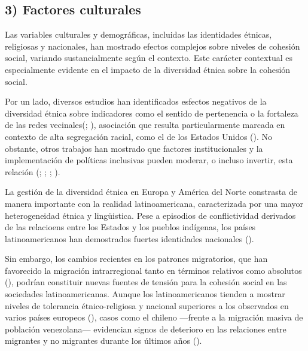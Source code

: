 \documentclass[
  letterpaper,
  DIV=11,
  numbers=noendperiod]{scrartcl}
\begin{document}
\subsection{3) Factores culturales}\label{factores-culturales}

Las variables culturales y demográficas, incluidas las identidades
étnicas, religiosas y nacionales, han mostrado efectos complejos sobre
niveles de cohesión social, variando sustancialmente según el contexto.
Este carácter contextual es especialmente evidente en el impacto de la
diversidad étnica sobre la cohesión social.

Por un lado, diversos estudios han identificados esfectos negativos de
la diversidad étnica sobre indicadores como el sentido de pertenencia o
la fortaleza de las redes
vecinales(; ),
asociación que resulta particularmente marcada en contexto de alta
segregación racial, como el de los Estados Unidos
(). No obstante,
otros trabajos han mostrado que factores institucionales y la
implementación de políticas inclusivas pueden moderar, o incluso
invertir, esta relación (; ;
;
).

La gestión de la diversidad étnica en Europa y América del Norte
constrasta de manera importante con la realidad latinoamericana,
caracterizada por una mayor heterogeneidad étnica y lingüistica. Pese a
episodios de conflictividad derivados de las relacioens entre los
Estados y los pueblos indígenas, los países latinoamericanos han
demostrados fuertes identidades nacionales
().

Sin embargo, los cambios recientes en los patrones migratorios, que han
favorecido la migración intrarregional tanto en términos relativos como
absolutos (), podrían
constituir nuevas fuentes de tensión para la cohesión social en las
sociedades latinoamericanas. Aunque los latinoamericanos tienden a
mostrar niveles de tolerancia étnico-religiosa y nacional superiores a
los observados en varios países europeos
(), casos
como el chileno ---frente a la migración masiva de población
venezolana--- evidencian signos de deterioro en las relaciones entre
migrantes y no migrantes durante los últimos años
().
\end{document}
